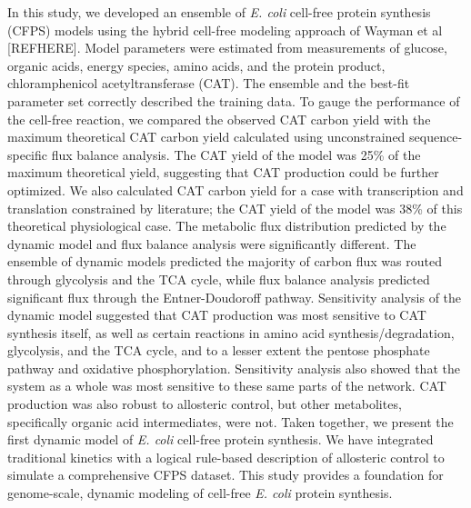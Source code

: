 \documentclass[12pt]{article}
\begin{document}
In this study, we developed an ensemble of \textit{E. coli} cell-free protein synthesis (CFPS) models using the hybrid cell-free modeling approach of Wayman et al [REFHERE].
Model parameters were estimated from measurements of glucose, organic acids, energy species, amino acids, and the protein product, chloramphenicol acetyltransferase (CAT).
The ensemble and the best-fit parameter set correctly described the training data.
To gauge the performance of the cell-free reaction, we compared the observed CAT carbon yield with the maximum theoretical CAT carbon yield calculated using unconstrained sequence-specific flux balance analysis.
The CAT yield of the model was 25\% of the maximum theoretical yield, suggesting that CAT production could be further optimized.
We also calculated CAT carbon yield for a case with transcription and translation constrained by literature; the CAT yield of the model was 38\% of this theoretical physiological case.
The metabolic flux distribution predicted by the dynamic model and flux balance analysis were significantly different.
The ensemble of dynamic models predicted the majority of carbon flux was routed through glycolysis and the TCA cycle, while flux balance analysis predicted significant flux through the Entner-Doudoroff pathway.
Sensitivity analysis of the dynamic model suggested that CAT production was most sensitive to CAT synthesis itself, as well as certain reactions in amino acid synthesis/degradation, glycolysis, and the TCA cycle, and to a lesser extent the pentose phosphate pathway and oxidative phosphorylation.
Sensitivity analysis also showed that the system as a whole was most sensitive to these same parts of the network.
CAT production was also robust to allosteric control, but other metabolites, specifically organic acid intermediates, were not.
Taken together, we present the first dynamic model of \textit{E. coli} cell-free protein synthesis.
We have integrated traditional kinetics with a logical rule-based description of allosteric control to simulate a comprehensive CFPS dataset.
This study provides a foundation for genome-scale, dynamic modeling of cell-free \textit{E. coli} protein synthesis.
\end{document}
